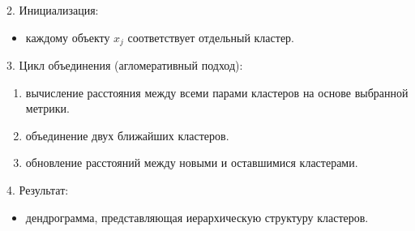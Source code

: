 2. Инициализация:
    \begin{itemize}
        \item каждому объекту $x_j$ соответствует отдельный кластер.
    \end{itemize}

3. Цикл объединения (агломеративный подход):
    \begin{enumerate}
        \item вычисление расстояния между всеми парами кластеров на основе выбранной метрики.
        \item объединение двух ближайших кластеров.
        \item обновление расстояний между новыми и оставшимися кластерами.
    \end{enumerate}

4. Результат:
    \begin{itemize}
        \item дендрограмма, представляющая иерархическую структуру кластеров.
    \end{itemize}

\clearpage
